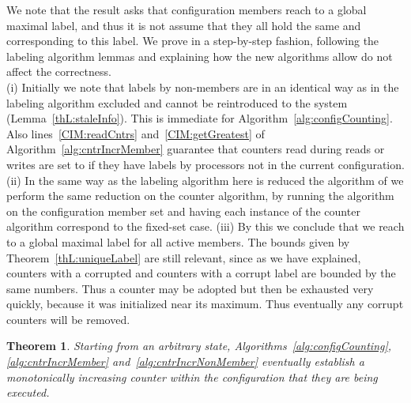 \documentclass[11pt]{article}
\newtheorem{theorem}{Theorem}[section]
\newenvironment{proof}{\noindent{\bf Proof.}}{\hfill}
\begin{document}
\begin{proof}
We note that the result asks that configuration members reach to a global maximal label, and thus it is not assume that they all hold the same  and  corresponding to this label.
We prove in a step-by-step fashion, following the labeling algorithm lemmas and explaining how the new algorithms allow do not affect the correctness.\\
\noindent (i) Initially we note that labels by non-members are in an identical way as in the labeling algorithm excluded and cannot be reintroduced to the system (Lemma~\ref{thL:staleInfo}).
This is immediate for Algorithm~\ref{alg:configCounting}.
Also lines~\ref{CIM:readCntrs} and~\ref{CIM:getGreatest} of Algorithm~\ref{alg:cntrIncrMember} guarantee that counters read during reads or writes are set to  if they have labels by processors not in the current configuration.\\
\noindent (ii) In the same way as the labeling algorithm here is reduced the algorithm of \cite{SSVS} we perform the same reduction on the counter algorithm, by running the algorithm on the configuration member set and having each instance of the counter algorithm correspond to the fixed-set case.
\noindent (iii) By this we conclude that we reach to a global maximal label for all active members.
The bounds given by Theorem~\ref{thL:uniqueLabel} are still relevant, since as we have explained, counters with a corrupted  and counters with a corrupt label are bounded by the same numbers.
Thus a counter may be adopted but then be exhausted very quickly, because it was initialized near its maximum.
Thus eventually any corrupt counters will be removed.
\end{proof}

\begin{theorem}
\label{thCNT:finalApp}
Starting from an arbitrary state, Algorithms~\ref{alg:configCounting}, \ref{alg:cntrIncrMember} and~\ref{alg:cntrIncrNonMember} eventually establish a monotonically increasing counter within the configuration that they are being executed.
\end{theorem}
\end{document}
